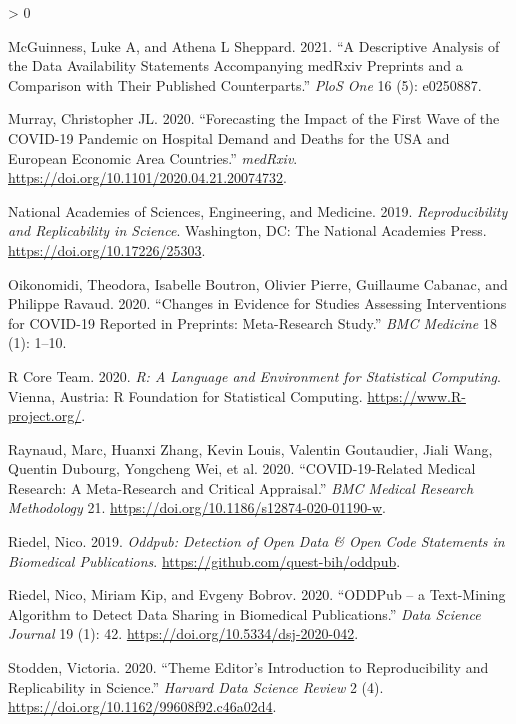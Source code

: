 \documentclass[
]{article}
\newlength{\cslhangindent}
\newenvironment{CSLReferences}[2] %
 {%
  \setlength{\parindent}{0pt}
  \ifodd #1 \everypar{\setlength{\hangindent}{\cslhangindent}}\ignorespaces\fi
  \ifnum #2 > 0
  \setlength{\parskip}{#2\baselineskip}
  \fi
 }%
 {}
\begin{document}
\begin{CSLReferences}{1}{0}
\leavevmode\hypertarget{ref-mcguinness2021descriptive}{}%
McGuinness, Luke A, and Athena L Sheppard. 2021. {``A Descriptive Analysis of the Data Availability Statements Accompanying medRxiv Preprints and a Comparison with Their Published Counterparts.''} \emph{PloS One} 16 (5): e0250887.

\leavevmode\hypertarget{ref-murray2020}{}%
Murray, Christopher JL. 2020. {``Forecasting the Impact of the First Wave of the COVID-19 Pandemic on Hospital Demand and Deaths for the USA and European Economic Area Countries.''} \emph{medRxiv}. \url{https://doi.org/10.1101/2020.04.21.20074732}.

\leavevmode\hypertarget{ref-NAP25303}{}%
National Academies of Sciences, Engineering, and Medicine. 2019. \emph{Reproducibility and Replicability in Science}. Washington, DC: The National Academies Press. \url{https://doi.org/10.17226/25303}.

\leavevmode\hypertarget{ref-oikonomidi2020changes}{}%
Oikonomidi, Theodora, Isabelle Boutron, Olivier Pierre, Guillaume Cabanac, and Philippe Ravaud. 2020. {``Changes in Evidence for Studies Assessing Interventions for COVID-19 Reported in Preprints: Meta-Research Study.''} \emph{BMC Medicine} 18 (1): 1--10.

\leavevmode\hypertarget{ref-citeR}{}%
R Core Team. 2020. \emph{{R: A Language and Environment for Statistical Computing}}. Vienna, Austria: R Foundation for Statistical Computing. \url{https://www.R-project.org/}.

\leavevmode\hypertarget{ref-raynaud2021}{}%
Raynaud, Marc, Huanxi Zhang, Kevin Louis, Valentin Goutaudier, Jiali Wang, Quentin Dubourg, Yongcheng Wei, et al. 2020. {``COVID-19-Related Medical Research: A Meta-Research and Critical Appraisal.''} \emph{BMC Medical Research Methodology} 21. \url{https://doi.org/10.1186/s12874-020-01190-w}.

\leavevmode\hypertarget{ref-citeODDPubpackage}{}%
Riedel, Nico. 2019. \emph{Oddpub: Detection of Open Data \& Open Code Statements in Biomedical Publications}. \url{https://github.com/quest-bih/oddpub}.

\leavevmode\hypertarget{ref-citePDDPub}{}%
Riedel, Nico, Miriam Kip, and Evgeny Bobrov. 2020. {``ODDPub -- a Text-Mining Algorithm to Detect Data Sharing in Biomedical Publications.''} \emph{Data Science Journal} 19 (1): 42. \url{https://doi.org/10.5334/dsj-2020-042}.

\leavevmode\hypertarget{ref-Stodden2020Theme}{}%
Stodden, Victoria. 2020. {``Theme Editor's Introduction to Reproducibility and Replicability in Science.''} \emph{Harvard Data Science Review} 2 (4). \url{https://doi.org/10.1162/99608f92.c46a02d4}.


\end{CSLReferences}
\end{document}
